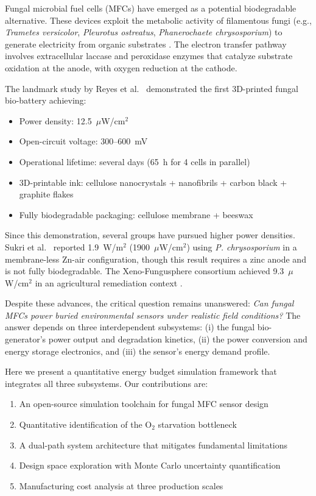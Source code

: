 \documentclass[twocolumn,10pt,a4paper]{article}
\begin{document}
Fungal microbial fuel cells (MFCs) have emerged as a potential biodegradable
alternative. These devices exploit the metabolic activity of filamentous fungi
(e.g., \textit{Trametes versicolor}, \textit{Pleurotus ostreatus},
\textit{Phanerochaete chrysosporium}) to generate electricity from organic
substrates \cite{sekrecka2018, umar2024}. The electron transfer pathway
involves extracellular laccase and peroxidase enzymes that catalyze substrate
oxidation at the anode, with oxygen reduction at the cathode.

The landmark study by Reyes et al.~\cite{reyes2024} demonstrated the first
3D-printed fungal bio-battery achieving:
\begin{itemize}
    \item Power density: 12.5~$\mu$W/cm$^2$
    \item Open-circuit voltage: 300--600~mV
    \item Operational lifetime: several days (65~h for 4 cells in parallel)
    \item 3D-printable ink: cellulose nanocrystals + nanofibrils + carbon
          black + graphite flakes
    \item Fully biodegradable packaging: cellulose membrane + beeswax
\end{itemize}

Since this demonstration, several groups have pursued higher power densities.
Sukri et al.~\cite{sukri2021} reported 1.9~W/m$^2$ (1900~$\mu$W/cm$^2$)
using \textit{P. chrysosporium} in a membrane-less Zn-air configuration,
though this result requires a zinc anode and is not fully biodegradable.
The Xeno-Fungusphere consortium achieved 9.3~$\mu$W/cm$^2$ in an
agricultural remediation context \cite{xeno2025}.

Despite these advances, the critical question remains unanswered: \emph{Can
fungal MFCs power buried environmental sensors under realistic field
conditions?} The answer depends on three interdependent subsystems:
(i) the fungal bio-generator's power output and degradation kinetics,
(ii) the power conversion and energy storage electronics, and (iii) the
sensor's energy demand profile.

Here we present a quantitative energy budget simulation framework that
integrates all three subsystems. Our contributions are:
\begin{enumerate}
    \item An open-source simulation toolchain for fungal MFC sensor design
    \item Quantitative identification of the O$_2$ starvation bottleneck
    \item A dual-path system architecture that mitigates fundamental
          limitations
    \item Design space exploration with Monte Carlo uncertainty quantification
    \item Manufacturing cost analysis at three production scales
\end{enumerate}
\end{document}
